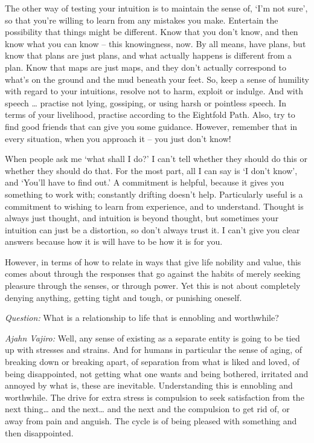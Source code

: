 The other way of testing your intuition is to maintain the sense of, `I'm not
sure', so that you're willing to learn from any mistakes you make. Entertain
the possibility that things might be different. Know that you don't know, and
then know what you can know -- this knowingness, now. By all means, have plans,
but know that plans are just plans, and what actually happens is different from
a plan. Know that maps are just maps, and they don't actually correspond to
what's on the ground and the mud beneath your feet. So, keep a sense of humility
with regard to your intuitions, resolve not to harm, exploit or indulge. And with speech \ldots{} practise not lying, gossiping, or using harsh or pointless
speech. In terms of your livelihood, practise according to the Eightfold Path.
Also, try to find good friends that can give you some guidance. However,
remember that in every situation, when you approach it -- you just don't know!

When people ask me `what shall I do?' I can't tell whether they should do this or whether they
should do that. For the most part, all I can say is `I don't know', and `You'll
have to find out.' A commitment is helpful, because it gives you something to
work with; constantly drifting doesn't help. Particularly useful is a commitment
to wishing to learn from experience, and to understand. Thought is always just
thought, and intuition is beyond thought, but sometimes your intuition can just
be a distortion, so don't always trust it. I can't give you clear answers
because how it is will have to be how it is for you.

However, in terms of how to relate in ways that give life nobility and value,
this comes about through the responses that go against the habits of merely seeking
pleasure through the senses, or through power. Yet this is not about completely
denying anything, getting tight and tough, or punishing oneself.

\bigskip

\emph{Question:} What is a relationship to life that is ennobling and worthwhile?

\emph{Ajahn Vajiro:} Well, any sense of existing as a separate entity is going to be
tied up with stresses and strains. And for humans in particular the sense of aging, of breaking down or breaking apart,
 of separation from what is liked and loved, of being disappointed, not getting what one wants and being bothered, irritated and annoyed by what is, these are inevitable. Understanding this is ennobling and worthwhile.
The drive for extra stress is compulsion to seek satisfaction from the next thing… and the next… and the next and the compulsion to get rid of, or away from pain and anguish. The cycle is of being pleased with something and then disappointed. 

